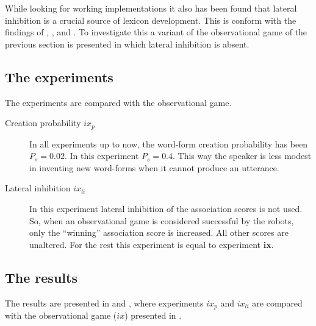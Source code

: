 While looking for working implementations it also has been found that lateral inhibition is a crucial source of lexicon development. This is conform with the findings of \citet{oliphant:1997}, \citet{steels:2000}, \citet{dejong:2000} and \citet{kaplan:2000}. To investigate this a variant of the observational game of the previous section is presented in which lateral inhibition is absent.

\subsection{The experiments}\label{sec:para:experiments}

The experiments are compared with the observational game.

\begin{description}
\item[Creation probability $ix_p$] In all experiments up to now, the word-form creation probability has been $P_s=0.02$. In this experiment $P_s=0.4$. This way the speaker is less modest in inventing new word-forms when it cannot produce an utterance. 
\item[Lateral inhibition $ix_{li}$] In this experiment lateral inhibition of the association scores is not used. So, when an observational game is considered successful by the robots, only the ``winning'' association score is increased. All other scores are unaltered. For the rest this experiment is equal to experiment {\bf ix}. 
\end{description}

\subsection{The results}

The results are presented in  and , where experiments $ix_p$ and $ix_{li}$ are compared with the observational game ($ix$) presented in .

